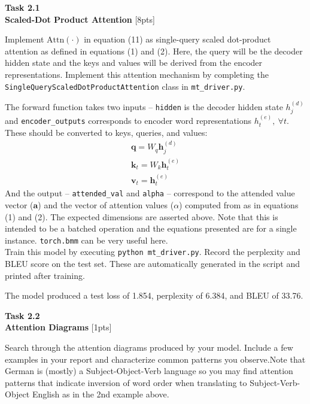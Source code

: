 \documentclass[12pt,article]{article}
\newenvironment{task}[2][Task]
    { \begin{mdframed}[backgroundcolor=gray!20] \textbf{#1 #2} \\}
    {  \end{mdframed}}
\begin{document}
\newpage
\begin{task}{2.1} 
\textbf{Scaled-Dot Product Attention} [8pts]

Implement $\mbox{Attn}(\cdot)$ in equation (11) as single-query scaled dot-product attention as defined in equations (1) and (2). Here, the query will be the decoder hidden state and the keys and values will be derived from the encoder representations. Implement this attention mechanism by completing the \texttt{SingleQueryScaledDotProductAttention} class in \texttt{mt\_driver.py}.

%
\noindent The forward function takes two inputs -- \texttt{hidden} is the decoder hidden state $h_j^{(d)}$ and \texttt{encoder\_outputs} corresponds to encoder word representations $h_t^{(e)},~\forall t$. These should be converted to keys, queries, and values:
\begin{eqnarray}
\mathbf{q} = W_q \mathbf{h}_j^{(d)}\\
\mathbf{k}_t = W_k \mathbf{h}_t^{(e)}\\
\mathbf{v}_t = \mathbf{h}_t^{(e)}
\end{eqnarray}
\noindent And the output -- \texttt{attended\_val} and \texttt{alpha} -- correspond to the attended value vector ($\mathbf{a}$) and the vector of attention values ($\alpha$) computed from as in equations (1) and (2). The expected dimensions are asserted above. Note that this is intended to be a batched operation and the equations presented are for a single instance. \texttt{torch.bmm} can be very useful here.\\[8pt]

\noindent Train this model by executing  \texttt{python mt\_driver.py}. Record the perplexity and BLEU score on the test set. These are automatically generated in the script and printed after training.
\end{task}

The model produced a test loss of 1.854, perplexity of 6.384, and BLEU of 33.76.

\newpage
\begin{task}{2.2} 
\textbf{Attention Diagrams} [1pts]

Search through the attention diagrams produced by your model. Include a few examples in your report and characterize common patterns you observe.Note that German is (mostly) a Subject-Object-Verb language so you may find attention patterns that indicate inversion of word order when translating to Subject-Verb-Object English as in the 2nd example above.
\end{task}
\end{document}
